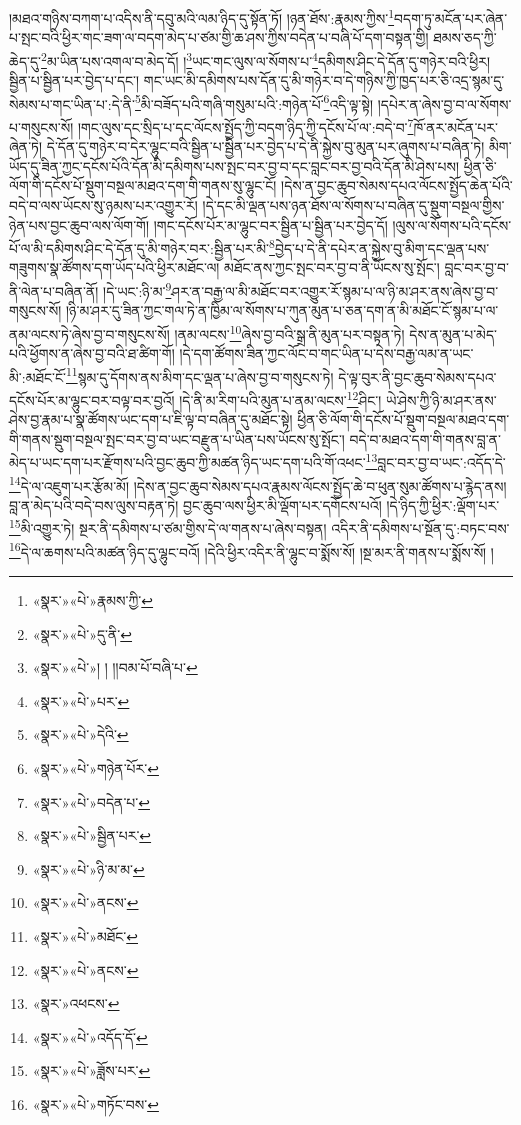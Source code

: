 །མཐའ་གཉིས་བཀག་པ་འདིས་ནི་དབུ་མའི་ལམ་ཉིད་དུ་སྟོན་ཏོ། །ཉན་ཐོས་:རྣམས་ཀྱིས་\footnote{«སྣར་»«པེ་»རྣམས་ཀྱི་}བདག་ཏུ་མངོན་པར་ཞེན་པ་སྤང་བའི་ཕྱིར་གང་ཟག་ལ་བདག་མེད་པ་ཙམ་གྱི་ཆ་ཤས་ཀྱིས་བདེན་པ་བཞི་པོ་དག་བསྟན་གྱི། ཐམས་ཅད་ཀྱི་ཆེད་དུ་\footnote{«སྣར་»«པེ་»དུ་ནི་}མ་ཡིན་པས་འགལ་བ་མེད་དོ། །\footnote{«སྣར་»«པེ་»། ། །།བམ་པོ་བཞི་པ་}ཡང་གང་ལུས་ལ་སོགས་པ་\footnote{«སྣར་»«པེ་»པར་}དམིགས་ཤིང་དེ་དོན་དུ་གཉེར་བའི་ཕྱིར། སྦྱིན་པ་སྦྱིན་པར་བྱེད་པ་དང་། གང་ཡང་མི་དམིགས་པས་དོན་དུ་མི་གཉེར་བ་དེ་གཉིས་ཀྱི་ཁྱད་པར་ཅི་འདྲ་སྙམ་དུ་སེམས་པ་གང་ཡིན་པ་:དེ་ནི་\footnote{«སྣར་»«པེ་»དེའི་}མི་བཟོད་པའི་གཞི་གསུམ་པའི་:གཉེན་པོ་\footnote{«སྣར་»«པེ་»གཉེན་པོར་}འདི་ལྟ་སྟེ། །དཔེར་ན་ཞེས་བྱ་བ་ལ་སོགས་པ་གསུངས་སོ། །གང་ལུས་དང་སྲིད་པ་དང་ལོངས་སྤྱོད་ཀྱི་བདག་ཉིད་ཀྱི་དངོས་པོ་ལ་:བདེ་བ་\footnote{«སྣར་»«པེ་»བདེན་པ་}ཁོ་ནར་མངོན་པར་ཞེན་ཏེ། དེ་དོན་དུ་གཉེར་བ་དེར་ལྷུང་བའི་སྦྱིན་པ་སྦྱིན་པར་བྱེད་པ་དེ་ནི་སྐྱེས་བུ་མུན་པར་ཞུགས་པ་བཞིན་ཏེ། མིག་ཡོད་དུ་ཟིན་ཀྱང་དངོས་པོའི་དོན་མི་དམིགས་པས་སྤང་བར་བྱ་བ་དང་བླང་བར་བྱ་བའི་དོན་མི་ཤེས་པས། ཕྱིན་ཅི་ལོག་གི་དངོས་པོ་སྡུག་བསྔལ་མཐའ་དག་གི་གནས་སུ་ལྷུང་ངོ། །དེས་ན་བྱང་ཆུབ་སེམས་དཔའ་ལོངས་སྤྱོད་ཆེན་པོའི་བདེ་བ་ལས་ཡོངས་སུ་ཉམས་པར་འགྱུར་རོ། །དེ་དང་མི་ལྡན་པས་ཉན་ཐོས་ལ་སོགས་པ་བཞིན་དུ་སྡུག་བསྔལ་གྱིས་ཉེན་པས་བྱང་ཆུབ་ལས་ལོག་གོ། །གང་དངོས་པོར་མ་ལྷུང་བར་སྦྱིན་པ་སྦྱིན་པར་བྱེད་དོ། །ལུས་ལ་སོགས་པའི་དངོས་པོ་ལ་མི་དམིགས་ཤིང་དེ་དོན་དུ་མི་གཉེར་བར་:སྦྱིན་པར་མི་\footnote{«སྣར་»«པེ་»སྦྱིན་པར་}བྱེད་པ་དེ་ནི་དཔེར་ན་སྐྱེས་བུ་མིག་དང་ལྡན་པས་གཟུགས་སྣ་ཚོགས་དག་ཡོད་པའི་ཕྱིར་མཐོང་ལ། མཐོང་ནས་ཀྱང་སྤང་བར་བྱ་བ་ནི་ཡོངས་སུ་སྤོང་། བླང་བར་བྱ་བ་ནི་ལེན་པ་བཞིན་ནོ། །དེ་ཡང་:ཉི་མ་\footnote{«སྣར་»«པེ་»ཉི་མ་མ་}ཤར་ན་བརྒྱ་ལ་མི་མཐོང་བར་འགྱུར་རོ་སྙམ་པ་ལ་ཉི་མ་ཤར་ནས་ཞེས་བྱ་བ་གསུངས་སོ། །ཉི་མ་ཤར་དུ་ཟིན་ཀྱང་གལ་ཏེ་ན་ཁྱིམ་ལ་སོགས་པ་ཀུན་མུན་པ་ཅན་དག་ན་མི་མཐོང་ངོ་སྙམ་པ་ལ་ནམ་ལངས་ཏེ་ཞེས་བྱ་བ་གསུངས་སོ། །ནམ་ལངས་\footnote{«སྣར་»«པེ་»ནངས་}ཞེས་བྱ་བའི་སྒྲ་ནི་མུན་པར་བསྟན་ཏེ། དེས་ན་མུན་པ་མེད་པའི་ཕྱོགས་ན་ཞེས་བྱ་བའི་ཐ་ཚིག་གོ། །དེ་དག་ཚོགས་ཟིན་ཀྱང་ལོང་བ་གང་ཡིན་པ་དེས་བརྒྱ་ལམ་ན་ཡང་མི་:མཐོང་ངོ་\footnote{«སྣར་»«པེ་»མཐོང་}སྙམ་དུ་དོགས་ནས་མིག་དང་ལྡན་པ་ཞེས་བྱ་བ་གསུངས་ཏེ། དེ་ལྟ་བུར་ནི་བྱང་ཆུབ་སེམས་དཔའ་དངོས་པོར་མ་ལྷུང་བར་བལྟ་བར་བྱའོ། །དེ་ནི་མ་རིག་པའི་མུན་པ་ནམ་ལངས་\footnote{«སྣར་»«པེ་»ནངས་}ཤིང་། ཡེ་ཤེས་ཀྱི་ཉི་མ་ཤར་ནས་ཤེས་བྱ་རྣམ་པ་སྣ་ཚོགས་ཡང་དག་པ་ཇི་ལྟ་བ་བཞིན་དུ་མཐོང་སྟེ། ཕྱིན་ཅི་ལོག་གི་དངོས་པོ་སྡུག་བསྔལ་མཐའ་དག་གི་གནས་སྡུག་བསྔལ་སྤང་བར་བྱ་བ་ཡང་བརྫུན་པ་ཡིན་པས་ཡོངས་སུ་སྤོང་། བདེ་བ་མཐའ་དག་གི་གནས་བླ་ན་མེད་པ་ཡང་དག་པར་རྫོགས་པའི་བྱང་ཆུབ་ཀྱི་མཚན་ཉིད་ཡང་དག་པའི་གོ་འཕང་\footnote{«སྣར་»འཕངས་}བླང་བར་བྱ་བ་ཡང་:འདོད་དེ་\footnote{«སྣར་»«པེ་»འདོད་དོ་}དེ་ལ་འཇུག་པར་རྩོམ་མོ། །དེས་ན་བྱང་ཆུབ་སེམས་དཔའ་རྣམས་ལོངས་སྤྱོད་ཆེ་བ་ཕུན་སུམ་ཚོགས་པ་རྙེད་ནས། བླ་ན་མེད་པའི་བདེ་བས་ལུས་བརྟན་ཏེ། བྱང་ཆུབ་ལས་ཕྱིར་མི་ལྡོག་པར་དགོངས་པའོ། །དེ་ཉིད་ཀྱི་ཕྱིར་:ལྡོག་པར་\footnote{«སྣར་»«པེ་»ཟློས་པར་}མི་འགྱུར་ཏེ། སྔར་ནི་དམིགས་པ་ཙམ་གྱིས་དེ་ལ་གནས་པ་ཞེས་བསྟན། འདིར་ནི་དམིགས་པ་སྔོན་དུ་:བཏང་བས་\footnote{«སྣར་»«པེ་»གཏོང་བས་}དེ་ལ་ཆགས་པའི་མཚན་ཉིད་དུ་ལྷུང་བའོ། །དེའི་ཕྱིར་འདིར་ནི་ལྷུང་བ་སྨོས་སོ། །སྔ་མར་ནི་གནས་པ་སྨོས་སོ། །
